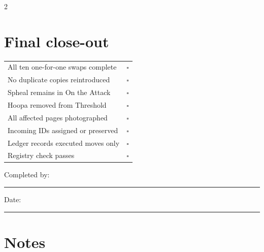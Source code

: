 \documentclass[10pt,a4paper]{article}
\newcommand{\cb}{$\square$}
\begin{document}
\begin{multicols}{2}
\section{Final close-out}
\begin{tabularx}{\linewidth}{@{}X l@{}}
All ten one-for-one swaps complete & \cb\\
No duplicate copies reintroduced & \cb\\
Spheal remains in On the Attack & \cb\\
Hoopa removed from Threshold & \cb\\
All affected pages photographed & \cb\\
Incoming IDs assigned or preserved & \cb\\
Ledger records executed moves only & \cb\\
Registry check passes & \cb\\
\end{tabularx}

Completed by: \rule{48mm}{0.3pt}\par
Date: \rule{30mm}{0.3pt}

\section{Notes}
\noindent\hrulefill\par\noindent\hrulefill\par\noindent\hrulefill\par\noindent\hrulefill\par\noindent\hrulefill\par\noindent\hrulefill
\end{multicols}
\end{document}
